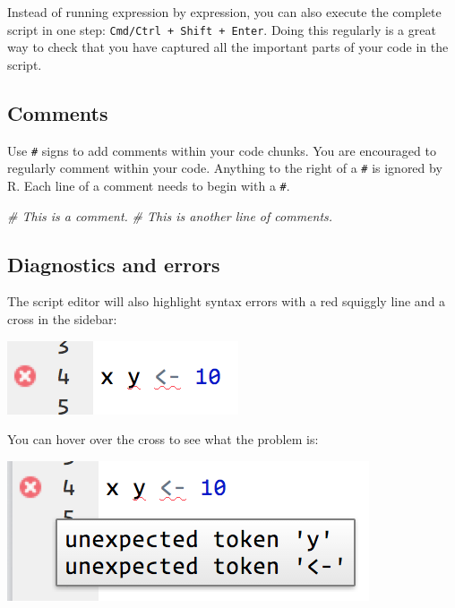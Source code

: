 \documentclass[
]{book}
\newenvironment{Shaded}{\begin{snugshade}}{\end{snugshade}}
\newcommand{\CommentTok}[1]{\textcolor[rgb]{0.56,0.35,0.01}{\textit{#1}}}
\begin{document}
Instead of running expression by expression, you can also execute the complete script in one step: \texttt{Cmd/Ctrl\ +\ Shift\ +\ Enter}. Doing this regularly is a great way to check that you have captured all the important parts of your code in the script.

\hypertarget{comments}{%
\subsection{Comments}\label{comments}}

Use \texttt{\#} signs to add comments within your code chunks. You are encouraged to regularly comment within your code. Anything to the right of a \texttt{\#} is ignored by R. Each line of a comment needs to begin with a \texttt{\#}.

\begin{Shaded}
\begin{Highlighting}[]
\CommentTok{# This is a comment.}
\CommentTok{# This is another line of comments.}
\end{Highlighting}
\end{Shaded}

\hypertarget{diagnostics-and-errors}{%
\subsection{Diagnostics and errors}\label{diagnostics-and-errors}}

The script editor will also highlight syntax errors with a red squiggly line and a cross in the sidebar:

\begin{center}\includegraphics[width=0.7\linewidth]{img/rstudio-diagnostic} \end{center}

You can hover over the cross to see what the problem is:

\begin{center}\includegraphics[width=0.7\linewidth]{img/rstudio-diagnostic-tip} \end{center}
\end{document}
